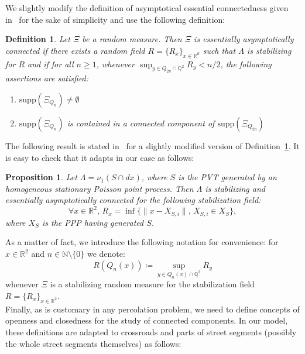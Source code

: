 \documentclass[10pt,a4paper]{amsart}
\theoremstyle{exampstyle}
\newtheorem{Definition}{Definition}
\newtheorem{Proposition}{Proposition}
\theoremstyle{exampnotations}
\begin{document}
\indent We slightly modify the definition of asymptotical essential connectedness given in~\cite{hirsch2018continuum} for the sake of simplicity and use the following definition:
\begin{Definition}\cite[Definition 2.5]{hirsch2018continuum}
\label{Def.eac}
Let $\Xi$ be a random measure. Then $\Xi$ is \emph{essentially asymptotically connected} if there exists a random field $R = \lbrace R_{x} \rbrace_{x \in \mathbb{R}^{d}}$ such that $\Lambda$ is stabilizing for $R$ and if for all $n \geq 1$, whenever $\displaystyle \sup_{y \in Q_{2n} \cap \mathbb{Q}^{2}} R_{y} < n/2$, the following assertions are satisfied:
\begin{enumerate}[label = (\arabic*)]
\item $\text{supp}(\Xi_{Q_{n}}) \neq \emptyset$
\item $\text{supp}(\Xi_{Q_{n}})$ is contained in a connected component of $\text{supp}(\Xi_{Q_{2n}})$
\end{enumerate}
\end{Definition}

The following result is stated in~\cite[Example 3.1]{hirsch2018continuum} for a slightly modified version of Definition~\ref{Def.eac}. It is easy to check that it adapts in our case as follows:

\begin{Proposition}
Let $\Lambda = \nu_{1}(S \cap dx)$, where $S$ is the PVT generated by an homogeneous stationary Poisson point process. Then $\Lambda$ is stabilizing and essentially asymptotically connected for the following stabilization field:
$$\forall x \in \mathbb{R}^{2}, \, R_x = \inf \lbrace \lVert x - X_{S,i} \rVert , \, X_{S,i} \in X_{S} \rbrace,$$
where $X_S$ is the PPP having generated $S$.
\end{Proposition}

As a matter of fact, we introduce the following notation for convenience: for $x \in \mathbb{R}^{2}$ and $n \in \mathbb{N}\setminus \lbrace 0 \rbrace$ we denote:
$$R(Q_n(x)) \coloneqq \sup_{y \in Q_n(x) \cap \mathbb{Q}^{2}} R_y$$
whenever $\Xi$ is a stabilizing random measure for the stabilization field $R = \lbrace R_x \rbrace _{x \in \mathbb{R}^{2}}$. \\


\indent Finally, as is customary in any percolation problem, we need to define concepts of openness and closedness for the study of connected components. In our model, these definitions are adapted to crossroads and parts of street segments (possibly the whole street segments themselves) as follows:
\end{document}
